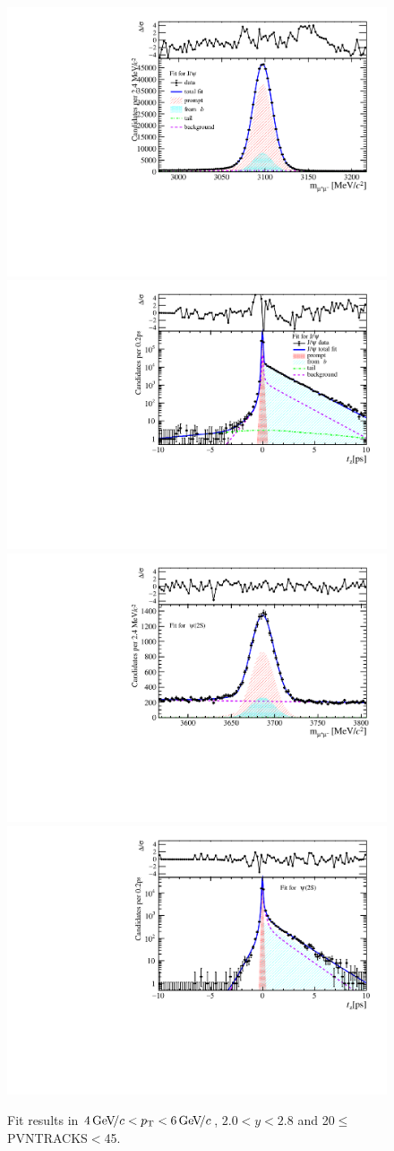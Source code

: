 \begin{figure}[H]
\begin{center}
\includegraphics[width=0.47\linewidth]{pdf/Jpsi/drawmass/n2y1pt3.pdf}
\includegraphics[width=0.47\linewidth]{pdf/Jpsi/2DFit/n2y1pt3.pdf}
\vspace*{-0.5cm}
\includegraphics[width=0.47\linewidth]{pdf/Psi2S/drawmass/n2y1pt3.pdf}
\includegraphics[width=0.47\linewidth]{pdf/Psi2S/2DFit/n2y1pt3.pdf}
\vspace*{-0.5cm}
\end{center}
\caption{Fit results in $4\text{\,Ge\kern -0.1em V\!/}c<p_{\mathrm{T}}<6\text{\,Ge\kern -0.1em V\!/}c$, $2.0<y<2.8$ and 20$\leq$PVNTRACKS$<$45.}
\label{Fitn2y1pt3}
\end{figure}
